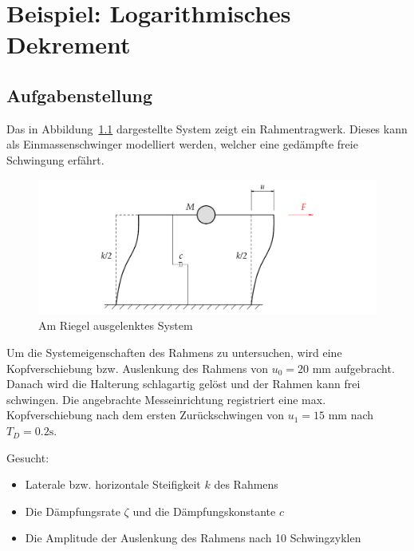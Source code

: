 \documentclass[
  letterpaper,
  DIV=11]{scrreprt}
\providecommand{\tightlist}{%
  \setlength{\itemsep}{0pt}\setlength{\parskip}{0pt}}\usepackage{longtable,booktabs,array}
\begin{document}
\hypertarget{beispiel-logarithmisches-dekrement}{%
\chapter{Beispiel: Logarithmisches
Dekrement}\label{beispiel-logarithmisches-dekrement}}

\hypertarget{aufgabenstellung-3}{%
\section{Aufgabenstellung}\label{aufgabenstellung-3}}

Das in Abbildung~\ref{fig-ems_log_dek_system} dargestellte System zeigt
ein Rahmentragwerk. Dieses kann als Einmassenschwinger modelliert
werden, welcher eine gedämpfte freie Schwingung erfährt.

\begin{figure}[H]

{\centering \includegraphics{index_files/mediabag/bilder/aufgabe_ems_log_dek.pdf}

}

\caption{\label{fig-ems_log_dek_system}Am Riegel ausgelenktes System}

\end{figure}

Um die Systemeigenschaften des Rahmens zu untersuchen, wird eine
Kopfverschiebung bzw. Auslenkung des Rahmens von \(u_0 = 20\text{ mm}\)
aufgebracht. Danach wird die Halterung schlagartig gelöst und der Rahmen
kann frei schwingen. Die angebrachte Messeinrichtung registriert eine
max. Kopfverschiebung nach dem ersten Zurückschwingen von
\(u_1 = 15\text{ mm}\) nach \(T_D = 0.2 \text{s}\).

Gesucht:

\begin{itemize}
\tightlist
\item
  Laterale bzw. horizontale Steifigkeit \(k\) des Rahmens
\item
  Die Dämpfungsrate \(\zeta\) und die Dämpfungskonstante \(c\)
\item
  Die Amplitude der Auslenkung des Rahmens nach 10 Schwingzyklen
\end{itemize}
\end{document}
